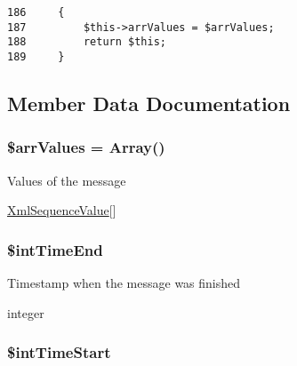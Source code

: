 \begin{Code}\begin{verbatim}186     {
187         $this->arrValues = $arrValues;
188         return $this;
189     }
\end{verbatim}
\end{Code}




\subsection{Member Data Documentation}
\hypertarget{class_xml_sequence_message_23c5acd360d2d5bf35038716f66b9020}{
\subsubsection[{\$arrValues}]{\setlength{\rightskip}{0pt plus 5cm}\$arrValues = Array()}}
\label{class_xml_sequence_message_23c5acd360d2d5bf35038716f66b9020}


Values of the message

\hyperlink{class_xml_sequence_value}{XmlSequenceValue}\mbox{[}\mbox{]} \hypertarget{class_xml_sequence_message_2c9ee3961c923198712100af2100510a}{
\subsubsection[{\$intTimeEnd}]{\setlength{\rightskip}{0pt plus 5cm}\$intTimeEnd}}
\label{class_xml_sequence_message_2c9ee3961c923198712100af2100510a}


Timestamp when the message was finished

integer \hypertarget{class_xml_sequence_message_266d64fdbc93740632447a8989775f6c}{
\subsubsection[{\$intTimeStart}]{\setlength{\rightskip}{0pt plus 5cm}\$intTimeStart}}
\label{class_xml_sequence_message_266d64fdbc93740632447a8989775f6c}


